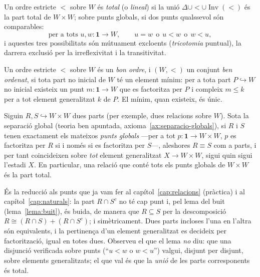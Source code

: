 \begin{definicio}\label{def:ordre-total-gen}
Un ordre estricte \({<}\) sobre \(W\) és \emph{total} (o \emph{lineal}) si
la unió \(\Delta\cup{<}\cup\operatorname{Inv}(<)\) és la part total de
\(W\times W\); sobre punts globals, si dos punts qualssevol són
comparables:
\[
\text{per a tots } u,w\colon\mathbf1\to W,\qquad u=w\ \ \text{o}\ \ u<w\ \ \text{o}\ \ w<u,
\]
i aquestes tres possibilitats són mútuament excloents (\emph{tricotomia}
puntual), la darrera exclusió per la irreflexivitat i la transitivitat.
\end{definicio}

\begin{definicio}\label{def:bon-ordre}
Un ordre estricte \({<}\) sobre \(W\) és un \emph{bon ordre}, i \((W,<)\) un
conjunt \emph{ben ordenat}, si tota part no inicial de \(W\) té un element
mínim: per a tota part \(P\hookrightarrow W\) no inicial existeix un punt
\(m\colon\mathbf1\to W\) que es factoritza per \(P\) i compleix \(m\le k\)
per a tot element generalitzat \(k\) de \(P\). El mínim, quan existeix, és
únic.
\end{definicio}

\begin{lema}\label{lema:transferencia-punts}
Siguin \(R,S\hookrightarrow W\times W\) dues parts (per exemple, dues relacions
sobre \(W\)). Sota la separació global (teoria ben apuntada,
axioma~\ref{ax:separacio-globals}), si \(R\) i \(S\) tenen exactament els
mateixos \emph{punts globals} ---per a tot \(p\colon\mathbf1\to W\times W\),
\(p\) es factoritza per \(R\) si i només si es factoritza per \(S\)---,
aleshores \(R\equiv S\) com a parts, i per tant coincideixen sobre \emph{tot}
element generalitzat \(X\to W\times W\), sigui quin sigui l'estadi \(X\). En
particular, una relació que conté tots els punts globals de \(W\times W\)
és la part total.
\end{lema}

\begin{prova}
És la reducció als punts que ja vam fer al capítol~\ref{cap:relacions}
(pràctica) i al capítol~\ref{cap:naturals}: la part \(R\cap S^c\) no té cap
punt i, pel lema del buit (lema~\ref{lema:buit}), és buida, de manera que
\(R\subseteq S\) per la descomposició \(R\cong(R\cap S)+(R\cap S^c)\); i
simètricament. Dues parts incloses l'una en l'altra són equivalents, i la
pertinença d'un element generalitzat es decideix per factorització, igual
en totes dues. Observeu el que el lema \emph{no} diu: que una disjunció
verificada sobre punts (\enquote{\(u<w\) o \(w<u\)}) valgui, disjunt per
disjunt, sobre elements generalitzats; el que val és que la \emph{unió} de
les parts corresponents és total.
\end{prova}

